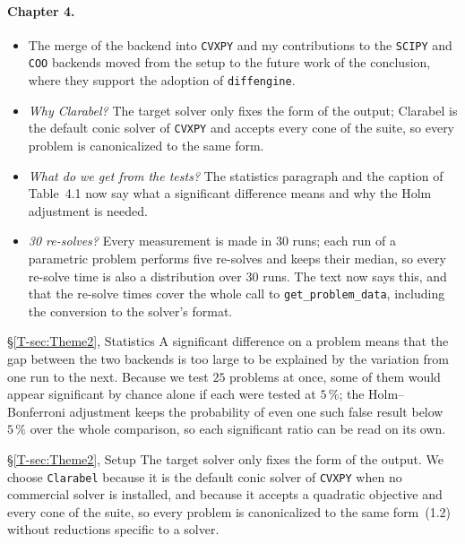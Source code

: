 \documentclass[letterpaper,12pt]{article}
\newcommand{\tsec}[1]{\S\ref{T-#1}}
\begin{document}
\paragraph{Chapter 4.}
\begin{itemize}[leftmargin=*]
\item The merge of the backend into \texttt{CVXPY} and my contributions to the \texttt{SCIPY}
  and \texttt{COO} backends moved from the setup to the future work of the conclusion, where
  they support the adoption of \texttt{diffengine}.
\item \emph{Why Clarabel?} The target solver only fixes the form of the output; Clarabel is the
  default conic solver of \texttt{CVXPY} and accepts every cone of the suite, so every problem
  is canonicalized to the same form.
\item \emph{What do we get from the tests?} The statistics paragraph and the caption of
  Table~4.1 now say what a significant difference means and why the Holm adjustment is needed.
\item \emph{30 re-solves?} Every measurement is made in $30$ runs; each run of a parametric
  problem performs five re-solves and keeps their median, so every re-solve time is also a
  distribution over $30$ runs. The text now says this, and that the re-solve times cover the
  whole call to \texttt{get\_problem\_data}, including the conversion to the solver's format.
\end{itemize}
\begin{thesisquote}{\tsec{sec:Theme2}, Statistics}
A significant difference on a problem means that the gap between the two backends is too large
to be explained by the variation from one run to the next. Because we test $25$ problems at once,
some of them would appear significant by chance alone if each were tested at $5\,\%$; the
Holm--Bonferroni adjustment keeps the probability of even one such false result below $5\,\%$
over the whole comparison, so each significant ratio can be read on its own.
\end{thesisquote}
\begin{thesisquote}{\tsec{sec:Theme2}, Setup}
The target solver only fixes the form of the output. We choose \texttt{Clarabel} because it is
the default conic solver of \texttt{CVXPY} when no commercial solver is installed, and because it
accepts a quadratic objective and every cone of the suite, so every problem is canonicalized to
the same form~(1.2) without reductions specific to a solver.
\end{thesisquote}
\end{document}
